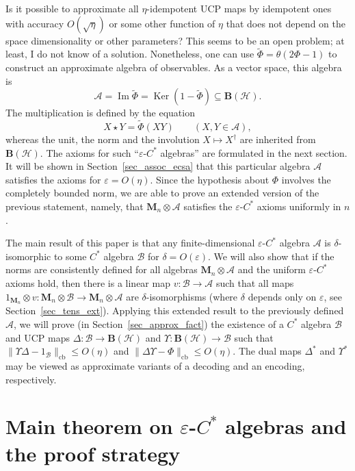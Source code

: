 \documentclass[12pt]{article}
\newcommand{\calA}{\mathcal{A}}
\newcommand{\calB}{\mathcal{B}}
\newcommand{\calH}{\mathcal{H}}
\DeclareMathOperator{\Ker}{Ker}
\DeclareMathOperator{\Img}{Im}
\newcommand{\Bo}{\mathbf{B}}
\newcommand{\wt}{\widetilde}
\newcommand*{\Ma}[1]{\mathbf{M}_{#1}}
\newcommand{\eps}{\varepsilon}
\renewcommand{\le}{\leqslant}
\newtheorem[definition]{Definition}[Theorem]{Definition}
\newtheorem[remark]{Example}[Theorem]{Example}
\newtheorem[remark]{Remark}[Theorem]{Remark}
\newtheorem[remark]{Question}[Theorem]{Open question}
\newtheorem*[definition]{definition}{Definition}
\newtheorem*[remark]{example}{Example}
\newtheorem*[remark]{remark}{Remark}
\newtheorem*[remark]{question}{Open question}
\numberwithin{equation}{section}
\begin{document}
Is it possible to approximate all $\eta$-idempotent UCP maps by idempotent ones with accuracy $O(\sqrt{\eta})$ or some other function of $\eta$ that does not depend on the space dimensionality or other parameters? This seems to be an open problem; at least, I do not know of a solution. Nonetheless, one can use $\wt{\Phi}=\theta(2\Phi-1)$ to construct an approximate algebra of observables. As a vector space, this algebra is
\begin{equation}
\calA=\Img\wt{\Phi}=\Ker(1-\wt{\Phi})\subseteq\Bo(\calH).
\end{equation}
The multiplication is defined by the equation
\begin{equation}
X\star Y=\wt{\Phi}(XY)\qquad (X,Y\in\calA),
\end{equation}
whereas the unit, the norm and the involution $X\mapsto X^\dag$ are inherited from $\Bo(\calH)$. The axioms for such ``$\eps$-$C^*$ algebras'' are formulated in the next section. It will be shown in Section~\ref{sec_assoc_ecsa} that this particular algebra $\calA$ satisfies the axioms for $\eps=O(\eta)$. Since the hypothesis about $\Phi$ involves the completely bounded norm, we are able to prove an extended version of the previous statement, namely, that $\Ma{n}\otimes\calA$ satisfies the $\eps$-$C^*$ axioms uniformly in $n$.

The main result of this paper is that any finite-dimensional $\eps$-$C^*$ algebra $\calA$ is $\delta$-isomorphic to some $C^*$ algebra $\calB$ for $\delta=O(\eps)$. We will also show that if the norms are consistently defined for all algebras $\Ma{n}\otimes\calA$ and the uniform $\eps$-$C^*$ axioms hold, then there is a linear map $v\colon\calB\to\calA$ such that all maps $1_{\Ma{n}}\otimes v\colon \Ma{n}\otimes\calB\to\Ma{n}\otimes\calA$ are $\delta$-isomorphisms (where $\delta$ depends only on $\eps$, see Section~\ref{sec_tens_ext}). Applying this extended result to the previously defined $\calA$, we will prove (in Section~\ref{sec_approx_fact}) the existence of a $C^*$ algebra $\calB$ and UCP maps $\Delta\colon\calB\to\Bo(\calH)$ and $\Upsilon\colon\Bo(\calH)\to\calB$ such that $\|\Upsilon\Delta-1_{\mathcal{B}}\|_{\mathrm{cb}} \le O(\eta)$ and $\|\Delta\Upsilon-\Phi\|_{\mathrm{cb}} \le O(\eta)$. The dual maps $\Delta^*$ and $\Upsilon^*$ may be viewed as approximate variants of a decoding and an encoding, respectively.


\section{Main theorem on \texorpdfstring{$\eps$-$C^*$}{epsilon-C*} algebras and the proof strategy}\label{sec_main_thm}
\end{document}
